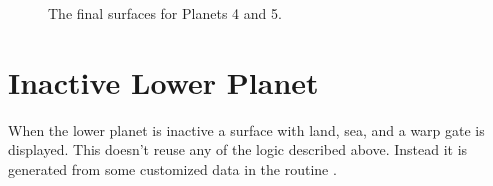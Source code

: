 \begin{figure}[H]
  {
    \begin{adjustbox}{width=10cm,center}
      \begin{subfigure}{0.7\textwidth}
      \end{subfigure}
      \begin{subfigure}{0.7\textwidth}
      \end{subfigure}
  \end{adjustbox}
  }\caption[]{The final surfaces for Planets 4 and 5.}
\end{figure}

\section{Inactive Lower Planet}
When the lower planet is inactive a surface with land, sea, and a warp gate is displayed. This doesn't reuse
any of the logic described above. Instead it is generated from some customized data in the routine
.

